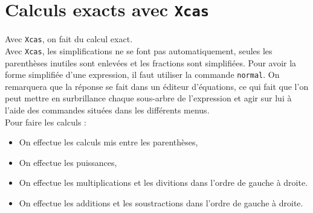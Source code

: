 \documentclass[a4paper,11pt]{book}
\begin{document}
\section{Calculs exacts avec {\tt Xcas}}
Avec {\tt Xcas}, on fait du calcul exact.\\
Avec {\tt Xcas}, les simplifications 
ne se font pas automatiquement, seules les
parenth\`eses inutiles sont enlev\'ees et les fractions sont simplifi\'ees. 
Pour avoir la forme simplifi\'ee d'une expression, il faut utiliser la commande
{\tt normal}. On remarquera que la r\'eponse se fait dans un 
\'editeur d'\'equations, ce qui fait que l'on peut mettre en surbrillance 
chaque sous-arbre de l'expression et agir sur lui \`a l'aide des commandes 
situ\'ees dans les diff\'erents menus.\\
Pour faire les calculs :
\begin{itemize}
\item On effectue les calculs mis entre les parenth\`eses,
\item On effectue les puissances,
\item On effectue les multiplications et les divitions dans l'ordre de gauche 
\`a droite.
\item On effectue les additions et les soustractions dans l'ordre de gauche \`a 
droite.
\end{itemize}
\end{document}
